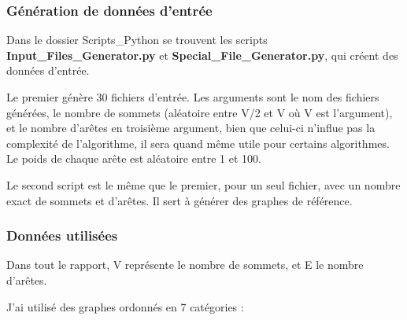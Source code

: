\documentclass[a4paper,11pt]{article}
\begin{document}
\subsubsection{Génération de données d'entrée}

Dans le dossier Scripts\_Python se trouvent les scripts \textbf{Input\_Files\_Generator.py} et \textbf{Special\_File\_Generator.py}, qui créent des données d'entrée.

Le premier génère 30 fichiers d'entrée. Les arguments sont le nom des fichiers générées, le nombre de sommets (aléatoire entre V/2 et V où V est l'argument), et le nombre d'arêtes en troisième argument, bien que celui-ci n'influe pas la complexité de l'algorithme, il sera quand même utile pour certains algorithmes. Le poids de chaque arête est aléatoire entre 1 et 100.

Le second script est le même que le premier, pour un seul fichier, avec un nombre exact de sommets et d'arêtes. Il sert à générer des graphes de référence.

\subsubsection{Données utilisées}

\noindent Dans tout le rapport, V représente le nombre de sommets, et E le nombre d'arêtes.

\noindent J'ai utilisé des graphes ordonnés en 7 catégories :
\end{document}

